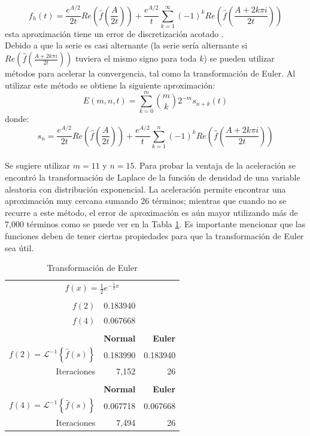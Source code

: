 \documentclass[11pt]{article}
\numberwithin{equation}{section} %
\begin{document}
\[
f_h(t)=\frac{e^{A/2}}{2t} Re\left(\hat{f}\left(\frac{A}{2t}\right)\right)+\frac{e^{A/2}}{t}\sum_{k=1}^{\infty}(-1)^k Re\left(\hat{f}\left(\frac{A+2k\pi i}{2t}\right)\right)
\]
esta aproximación tiene un error de discretización acotado \cite{abate1995}.\\

Debido a que la serie es casi alternante (la serie sería alternante si $Re\left(\hat{f}\left(\frac{A+2k\pi i}{2t}\right)\right)
$ tuviera el mismo signo para toda $k$) se pueden utilizar métodos para acelerar la convergencia, tal como la transformación de Euler. Al utilizar este método se obtiene la siguiente aproximación:
\[
E(m,n,t)=\sum_{k=0}^m \binom mk 2^{-m}s_{n+k}(t)
\]
donde:
\[
s_n=\frac{e^{A/2}}{2t} Re\left(\hat{f}\left(\frac{A}{2t}\right)\right)+\frac{e^{A/2}}{t}\sum_{k=1}^{n}(-1)^k Re\left(\hat{f}\left(\frac{A+2k\pi i}{2t}\right)\right)
\]
\\

Se sugiere utilizar $m=11$ y $n=15$. Para probar la ventaja de la aceleración se encontró la transformación de Laplace de la función de densidad de una variable aleatoria con distribución exponencial. La aceleración permite encontrar una aproximación muy cercana sumando 26 términos; mientras que cuando no se recurre a este método, el error de aproximación es aún mayor utilizando más de 7,000 términos como se puede ver en la Tabla \ref{tab:euler}. Es importante mencionar que las funciones deben de tener ciertas propiedades para que la transformación de Euler sea útil.\\

\begin{table}[htbp]
\centering
\caption{Transformación de Euler}
\begin{tabular}{r r r}
\multicolumn{3}{c}{$f(x)=\frac{1}{2}e^{-\frac{1}{2}x}$} \\
\\
$f(2)$ & 0.183940 & \\
$f(4)$ & 0.067668 & \\
\\
& \bf{Normal} & \bf{Euler} \\
$f(2)=\mathcal{L}^{-1}\left\{\hat{f}(s)\right\}$ & 0.183990 & 0.183940 \\
Iteraciones & 7,152 & 26 \\
\\
& \bf{Normal} & \bf{Euler} \\
$f(4)=\mathcal{L}^{-1}\left\{\hat{f}(s)\right\}$ & 0.067718 & 0.067668 \\
Iteraciones & 7,494 & 26 \\
\end{tabular}%
\label{tab:euler}%
\end{table}%

\clearpage

\listoftables
\clearpage

\listoffigures
\clearpage

\nocite{*}



\end{document}
